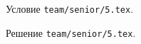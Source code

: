 \problem{}
Условие \texttt{team/senior/5.tex}.

\solution Решение \texttt{team/senior/5.tex}.
\endproblem
